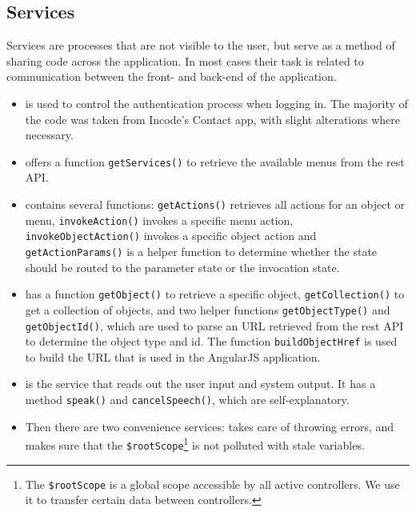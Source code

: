 \subsection{Services}
\label{subsection:services}
Services are processes that are not visible to the user, but serve as a method of sharing code across the application. In most cases their task is related to communication between the front- and back-end of the application.

\begin{itemize}
	\item {} is used to control the authentication process when logging in. The majority of the code was taken from Incode's Contact app\cite{incod72:online}, with slight alterations where necessary.

	\item {} offers a function \texttt{getServices()} to retrieve the available menus from the \acrshort{rest} API.

	\item {} contains several functions: \texttt{getActions()} retrieves all actions for an object or menu, \texttt{invokeAction()} invokes a specific menu action, \texttt{invokeObjectAction()} invokes a specific object action and \texttt{getActionParams()} is a helper function to determine whether the state should be routed to the parameter state or the invocation state.

	\item {} has a function \texttt{getObject()} to retrieve a specific object, \texttt{getCollection()} to get a collection of objects, and two helper functions \texttt{getObjectType()} and \texttt{getObjectId()}, which are used to parse an URL retrieved from the \acrshort{rest} API to determine the object type and id. The function \texttt{buildObjectHref} is used to build the URL that is used in the AngularJS application.

	\item {} is the service that reads out the user input and system output. It has a method \texttt{speak()} and \texttt{cancelSpeech()}, which are self-explanatory.

	\item Then there are two convenience services:  takes care of throwing errors, and  makes sure that the \texttt{\$rootScope}\footnote{The \texttt{\$rootScope} is a global scope accessible by all active controllers. We use it to transfer certain data between controllers.} is not polluted with stale variables.
\end{itemize}


